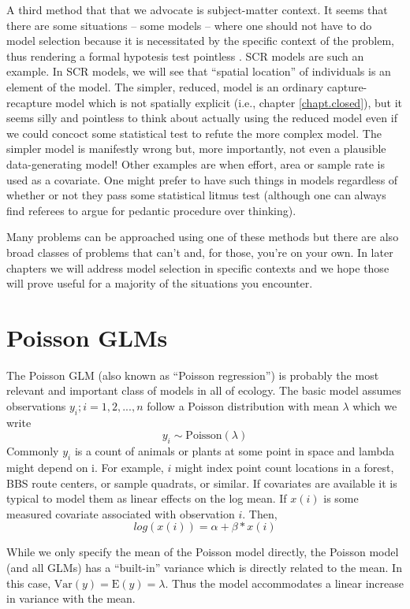 A third method that that we advocate is subject-matter
context. It seems that there are some situations -- some models -- where one should not
have to do model selection because it is necessitated by the specific
context of the problem, thus rendering a formal hypotesis test pointless
\citep{johnson:1999}.
SCR models are such an example. In SCR models, we will see that
``spatial location'' of individuals is an element of the model. The
simpler, reduced, model is an ordinary capture-recapture model which
is not spatially explicit (i.e., chapter \ref{chapt.closed}),
but it seems silly and pointless to think about actually using the
reduced model even if we could concoct some statistical test to refute
the more complex model.  The simpler model is manifestly wrong but,
more importantly, not even a plausible data-generating model!
Other examples are when effort, area or
sample rate is used as a covariate. One might prefer to have such things in
models regardless of whether or not they pass some statistical litmus
test (although one can always find referees to argue for pedantic procedure
over thinking).


Many problems can be approached using one of these methods but there
are also broad classes of problems that can't and, for those, you're
on your own. In later chapters we will address model selection in
specific contexts and we hope those will prove useful for a majority
of the situations you encounter.


\section{Poisson GLMs}
\label{glms.sec.poisson}

The Poisson GLM (also known as ``Poisson regression'') is probably the
most relevant and important class of models in all of ecology. The
basic model assumes observations $y_{i}; i=1,2,...,n$ follow a Poisson
distribution with mean $\lambda$ which we write
\[
 	y_{i} \sim \mbox{Poisson}(\lambda)
\]
Commonly $y_{i}$ is a count of animals or plants at some point in
space and lambda might depend on i. For example, $i$ might index point
count locations in a forest, BBS route centers, or sample quadrats, or
similar.  If covariates are available it is typical to model them as
linear effects on the log mean. If $x(i)$ is some measured covariate
associated with observation $i$. Then,
\[
 	log(x(i)) = \alpha  + \beta*x(i)
\]

While we only specify the mean of the Poisson model directly, the
Poisson model (and all GLMs) has a ``built-in'' variance which is
directly related to the mean. In this case, $\mbox{Var}(y) = \mbox{E}(y) =
\lambda$. Thus the model accommodates a linear increase in variance
with the mean.


